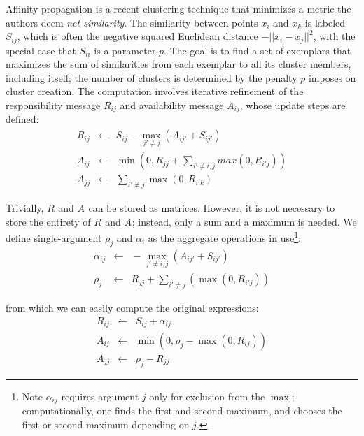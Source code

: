 \documentclass[times, 10pt]{article}
\newcommand{\eqspace}{\!\!\!\!}
\newcommand{\respo}[2]{R_{#1#2}}
\newcommand{\avail}[2]{A_{#1#2}}
\newcommand{\simil}[2]{S_{#1#2}}
\newcommand{\frho}[1]{\rho_{#1}}
\newcommand{\falpha}[2]{\alpha_{#1#2}}
\begin{document}
Affinity propagation\cite{affinity} is a recent clustering technique that minimizes a metric the authors deem {\it net similarity}.
The similarity between points $x_i$ and $x_k$ is labeled $\simil{i}{j}$, which is often the negative squared Euclidean distance $-||x_i - x_j||^2$, with the special case that $\simil{i}{i}$ is a parameter $p$.
The goal is to find a set of exemplars that maximizes the sum of similarities from each exemplar to all its cluster members, including itself; the number of clusters is determined by the penalty $p$ imposes on cluster creation.
The computation involves iterative refinement of the responsibility message $\respo{i}{j}$ and availability message $\avail{i}{j}$, whose update steps are defined:
\begin{eqnarray*}
  \respo{i}{j} \eqspace&\gets&\eqspace \simil{i}{j} - \max_{j' \neq j} (\avail{i}{j'} + \simil{i}{j'})
  \\
  \avail{i}{j} \eqspace&\gets&\eqspace \min \! \left(\! 0, \respo{j}{j} + \sum_{i' \neq i,j} max(0, \respo{i'}{j})\!\right)
  \\
  \avail{j}{j} \eqspace&\gets&\eqspace \sum_{i' \neq j} \max(0, \respo{i'}{k})
\end{eqnarray*}


\noindent Trivially, $\respo{}{}$ and $\avail{}{}$ can be stored as matrices.
However, it is not necessary to store the entirety of $\respo{}{}$ and $\avail{}{}$; instead, only a sum and a maximum is needed.
We define single-argument $\frho{j}$ and $\falpha{i}{}$ as the aggregate operations in use\footnote{
Note $\falpha{i}{j}$ requires argument $j$ only for exclusion from the $\max$; computationally, one finds the first and second maximum, and chooses the first or second maximum depending on $j$.}:
\begin{eqnarray*}
  \falpha{i}{j} \eqspace&\gets&\eqspace - \max_{j' \neq i,j} (\avail{i}{j'} + \simil{i}{j'})
  \\
  \frho{j} \eqspace&\gets&\eqspace \respo{j}{j} + \sum_{i' \neq j} \left( \max(0, \respo{i'}{j}) \right)
\end{eqnarray*}

\noindent from which we can easily compute the original expressions:
\begin{eqnarray*}
  \respo{i}{j} \eqspace&\gets&\eqspace \simil{i}{j} + \falpha{i}{j}
  \\
  \avail{i}{j} \eqspace&\gets&\eqspace \min \left(0, \frho{j} - \max(0, \respo{i}{j}) \right)
  \\
  \avail{j}{j} \eqspace&\gets&\eqspace \frho{j} - \respo{j}{j}
\end{eqnarray*}
\end{document}

